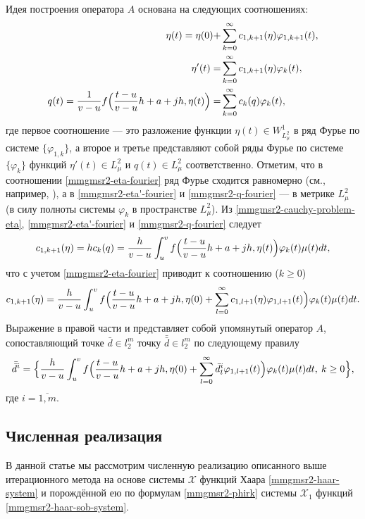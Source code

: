 Идея построения оператора $A$ основана на следующих соотношениях:
\begin{align}
\label{mmgmsr2-eta-fourier}
\eta(t) = \eta(0)+ &\sum_{k=0}^\infty c_{1,k+1}(\eta) \varphi_{1,k+1}(t),\\
\label{mmgmsr2-eta'-fourier}
\eta'(t) =  &\sum_{k=0}^\infty c_{1,k+1}(\eta)\varphi_k(t),\\
\label{mmgmsr2-q-fourier}
q(t)=
\frac{1}{v-u}f\Bigl(\frac{t-u}{v-u}h+a+jh,\eta(t)\Bigr)
= &\sum_{k=0}^\infty c_{k}(q)\varphi_k(t),
\end{align}
где первое соотношение --- это разложение функции $\eta(t) \in W^1_{L^2_\mu}$ в ряд Фурье по системе $\{\varphi_{1,k}\}$, а второе и третье представляют собой ряды Фурье по системе $\{\varphi_{k}\}$ функций $\eta'(t) \in L^2_\mu$ и $q(t) \in L^2_\mu$ соответственно.
Отметим, что в соотношении \eqref{mmgmsr2-eta-fourier} ряд Фурье сходится равномерно (см., например, \cite[теорема 2]{mmgmsr2-SHII-MMG-Demi2015}), а в \eqref{mmgmsr2-eta'-fourier} и \eqref{mmgmsr2-q-fourier} --- в метрике $L^2_\mu$ (в силу полноты системы $\varphi_{k}$ в пространстве $L^2_\mu$). Из \eqref{mmgmsr2-cauchy-problem-eta}, \eqref{mmgmsr2-eta'-fourier} и \eqref{mmgmsr2-q-fourier} следует
\begin{equation*}
c_{1,k+1}(\eta)=hc_k(q)=
\frac{h}{v-u}
\int_{u}^{v}
f\Bigl(\frac{t-u}{v-u}h+a+jh,\eta(t)\Bigr)
\varphi_k(t)\mu(t)dt,
\end{equation*}
что с учетом \eqref{mmgmsr2-eta-fourier} приводит к соотношению ($k \ge 0$)
\begin{equation*}
c_{1,k+1}(\eta)=
\frac{h}{v-u}\int_{u}^{v}f\Bigl(\frac{t-u}{v-u}h+a+jh,\eta(0)+ \sum_{l=0}^\infty c_{1,l+1}(\eta) \varphi_{1,l+1}(t)\Bigr)\varphi_k(t)\mu(t)dt.
\end{equation*}
Выражение в правой части и представляет собой упомянутый оператор $A$, сопоставляющий точке $\bar{d} \in l^m_2$ точку $\bar{\bar{d}} \in l^m_2$ по следующему правилу
\begin{equation*}
\bar{\bar{d}}^i=
\Bigl\{
\frac{h}{v-u}\int_{u}^{v}f\Bigl(\frac{t-u}{v-u}h+a+jh,\eta(0)+
\sum_{l=0}^\infty \bar{d}^i_l \varphi_{1,l+1}(t)\Bigr)\varphi_k(t)\mu(t)dt,
\: k \ge 0
\Bigr\},
\end{equation*}
где $i=\overline{1,m}$.

\subsection{Численная реализация}
В данной статье мы рассмотрим численную реализацию описанного выше итерационного метода на основе системы $\mathcal{X}$ функций Хаара \eqref{mmgmsr2-haar-system} и порождённой ею по формулам \eqref{mmgmsr2-phirk} системы $\mathcal{X}_1$ функций \eqref{mmgmsr2-haar-sob-system}.

